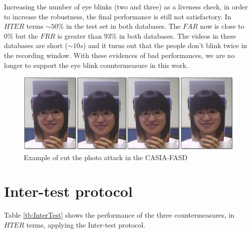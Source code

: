 Increasing the number of eye blinks (two and three) as a liveness check, in order to increase the robustness, the final performance is still not satisfactory. In $HTER$ terms $\sim 50\%$ in the test set in both databases. The $FAR$ now is close to $0\%$ but the $FRR$ is greater than $93\%$ in both databases. The videos in these databases are short ($\sim10s$) and it turns out that the people don't blink twice in the recording window. With these evidences of bad performances, we are no longer to support the eye blink countermeasure in this work.

\begin{figure}[!btb]
\begin{center}
\includegraphics [width=15cm] {images/blink_scene.pdf}
\caption[Example of the cut photo attack in the CASIA-FASD]{Example of cut the photo attack in the CASIA-FASD}
\label{fig:blink_scene}
\end{center}
\end{figure}


\section{Inter-test protocol}
\label{sec:Intra_test}

Table \ref{tb:InterTest} shows the performance of the three countermeasures, in $HTER$ terms, applying the Inter-test protocol.

